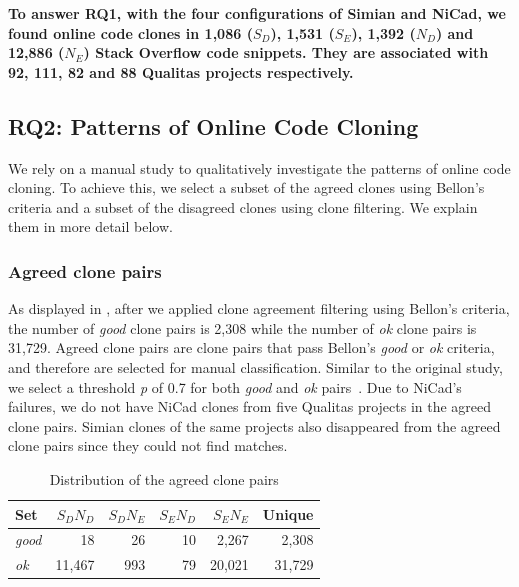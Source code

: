 \documentclass[sigconf,review, anonymous]{acmart}
\begin{document}
\textbf{To answer RQ1, with the four configurations of Simian and NiCad, we found online code clones in 1,086 ($S_D$), 1,531 ($S_E$), 1,392 ($N_D$) and 12,886 ($N_E$) Stack Overflow code snippets. They are associated with 92, 111, 82 and 88 Qualitas projects respectively.} 

\subsection{RQ2: Patterns of Online Code Cloning}

We rely on a manual study to qualitatively investigate the patterns of online code cloning. To achieve this, we select a subset of the agreed clones using Bellon's criteria and a subset of the disagreed clones using clone filtering. We explain them in more detail below.

\subsubsection{Agreed clone pairs}

As displayed in , after we applied clone agreement filtering using Bellon's criteria, the number of \textit{good} clone pairs is 2,308 while the number of \textit{ok} clone pairs is 31,729. %
Agreed clone pairs are clone pairs that pass Bellon's \textit{good} or \textit{ok} criteria, and therefore are selected for manual classification. Similar to the original study, we select a threshold \textit{p} of 0.7 for both \textit{good} and \textit{ok} pairs~\cite{Bellon2007}. %
Due to NiCad's failures, we do not have NiCad clones from five Qualitas projects in the agreed clone pairs. Simian clones of the same projects also disappeared from the agreed clone pairs since they could not find matches.

\begin{table}
	\centering
	\caption{Distribution of the agreed clone pairs}
	\label{t_agreed_good_clone_pairs}
	\small
	\begin{tabular}{l|r|r|r|r|r}
		\hline
		Set & $S_DN_D$ & $S_DN_E$ & $S_EN_D$ & $S_EN_E$ & Unique \\
		\hline
		\textit{good} & 18 & 26 & 10 & 2,267 & 2,308 \\
		\textit{ok} & 11,467 & 993 & 79 & 20,021 & 31,729  \\
		\hline
	\end{tabular} %
\end{table}
\end{document}
